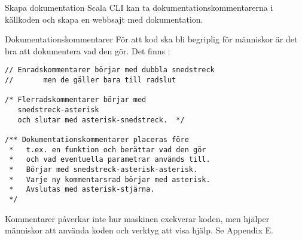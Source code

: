 \begin{Slide}{Skapa dokumentation}
Scala CLI kan ta dokumentationskommentarerna i källkoden och skapa en webbsajt med dokumentation.

\vspace{2em}
\end{Slide}
  
  

\begin{Slide}{Dokumentationskommentarer}\footnotesize
För att kod ska bli begriplig för människor är det bra att dokumentera vad den gör. Det finns :
\begin{lstlisting}
// Enradskommentarer börjar med dubbla snedstreck
//       men de gäller bara till radslut

/* Flerradskommentarer börjar med
   snedstreck-asterisk
   och slutar med asterisk-snedstreck.  */

/** Dokumentationskommentarer placeras före
 *   t.ex. en funktion och berättar vad den gör
 *   och vad eventuella parametrar används till.
 *   Börjar med snedstreck-asterisk-asterisk.
 *   Varje ny kommentarsrad börjar med asterisk.
 *   Avslutas med asterisk-stjärna.
 */
\end{lstlisting}
Kommentarer påverkar inte hur maskinen exekverar koden, men hjälper människor att använda koden och verktyg att visa hjälp. Se Appendix E.
\end{Slide}

\ifkompendium\else




